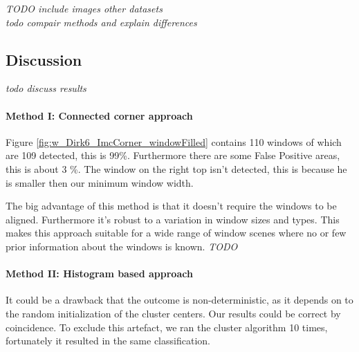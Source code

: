



\emph{TODO include images other datasets} \\
\emph{todo compair methods and explain differences}


\subsection{Discussion}  %
\emph{ todo discuss results }

\paragraph{Method I: Connected corner approach} 
Figure \ref{fig:w_Dirk6_ImcCorner_windowFilled} contains 110 windows of which
are 109 detected, this is 99\%. Furthermore there are some False Positive areas,
this is about 3 \%.  The window on the right top isn't detected, this is because
he is smaller then our minimum window width.


The big advantage of this method is that it doesn't require the windows to be aligned.
Furthermore it's robust to a variation in window sizes and types. This makes
this approach suitable for a wide range of window scenes where no or few prior
information about the windows is known.
\emph{TODO}


\paragraph{Method II: Histogram based approach} 



It could be a drawback that the outcome is non-deterministic, as it depends on to the
random initialization of the cluster centers. Our results could be correct by
coincidence.  To exclude this artefact, we ran the cluster algorithm 10 times,
fortunately it resulted in the same classification.


